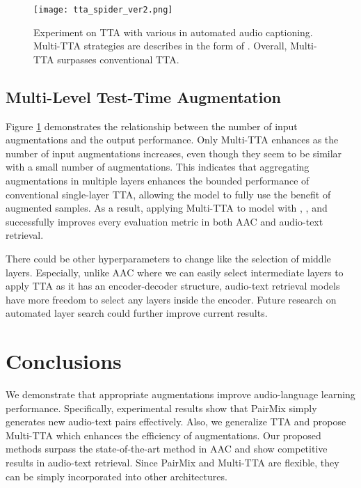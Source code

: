 \documentclass{INTERSPEECH2023}
\begin{document}
\begin{figure}
  \centering
  \texttt{[image: tta\_spider\_ver2.png]}
  \caption{Experiment on TTA with various  in automated audio captioning. Multi-TTA strategies are describes in the form of . Overall, Multi-TTA surpasses conventional TTA.}
  \label{fig:test2}
\end{figure}


\subsection{Multi-Level Test-Time Augmentation}
Figure \ref{fig:test2} demonstrates the relationship between the number of input augmentations and the output performance. Only Multi-TTA enhances as the number of input augmentations  increases, even though they seem to be similar with a small number of augmentations. This indicates that aggregating augmentations in multiple layers enhances the bounded performance of conventional single-layer TTA, allowing the model to fully use the benefit of augmented samples. As a result, applying Multi-TTA to model with , , and  successfully improves every evaluation metric in both AAC and audio-text retrieval.

There could be other hyperparameters to change like the selection of middle layers. Especially, unlike AAC where we can easily select intermediate layers to apply TTA as it has an encoder-decoder structure, audio-text retrieval models have more freedom to select any layers inside the encoder. Future research on automated layer search could further improve current results. 


\section{Conclusions}
\label{sec:subhead}

We demonstrate that appropriate augmentations improve audio-language learning performance. Specifically, experimental results show that PairMix simply generates new audio-text pairs effectively. Also, we generalize TTA and propose Multi-TTA which enhances the efficiency of augmentations. Our proposed methods surpass the state-of-the-art method in AAC and show competitive results in audio-text retrieval. Since PairMix and Multi-TTA are flexible, they can be simply incorporated into other architectures.




\end{document}
